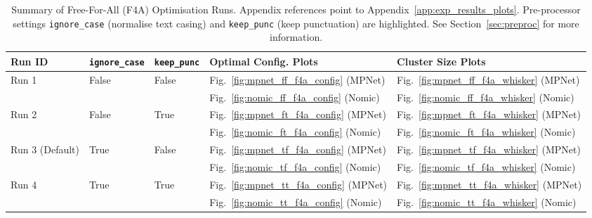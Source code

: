 \documentclass[10pt,oneside]{report}
\begin{document}
\begin{table}[H]
    \centering
    \begin{adjustbox}{max width=\textwidth}
    \begin{tabular}{l l l l l}
        \toprule
        \textbf{Run ID} & \textbf{\texttt{ignore\_case}} & \textbf{\texttt{keep\_punc}} & \textbf{Optimal Config. Plots} & \textbf{Cluster Size Plots} \\
        \midrule
        Run 1           & False   & False & Fig.~\ref{fig:mpnet_ff_f4a_config} (MPNet) & Fig.~\ref{fig:mpnet_ff_f4a_whisker} (MPNet) \\
                        &         &                             & Fig.~\ref{fig:nomic_ff_f4a_config} (Nomic) & Fig.~\ref{fig:nomic_ff_f4a_whisker} (Nomic) \\
        Run 2           & False   & True & Fig.~\ref{fig:mpnet_ft_f4a_config} (MPNet) & Fig.~\ref{fig:mpnet_ft_f4a_whisker} (MPNet) \\
                        &         &                             & Fig.~\ref{fig:nomic_ft_f4a_config} (Nomic) & Fig.~\ref{fig:nomic_ft_f4a_whisker} (Nomic) \\
        Run 3 (Default) & True    & False & Fig.~\ref{fig:mpnet_tf_f4a_config} (MPNet) & Fig.~\ref{fig:mpnet_tf_f4a_whisker} (MPNet) \\
                        &         &                              & Fig.~\ref{fig:nomic_tf_f4a_config} (Nomic) & Fig.~\ref{fig:nomic_tf_f4a_whisker} (Nomic) \\
        Run 4           & True    & True & Fig.~\ref{fig:mpnet_tt_f4a_config} (MPNet) & Fig.~\ref{fig:mpnet_tt_f4a_whisker} (MPNet) \\
                        &         &                                                    & Fig.~\ref{fig:nomic_tt_f4a_config} (Nomic) & Fig.~\ref{fig:nomic_tt_f4a_whisker} (Nomic) \\
        \bottomrule
    \end{tabular}
    \end{adjustbox}
    \caption{Summary of Free-For-All (F4A) Optimisation Runs. Appendix references point to Appendix~\ref{app:exp_results_plots}. Pre-processor settings \texttt{ignore\_case} (normalise text casing) and \texttt{keep\_punc} (keep punctuation) are highlighted. See Section~\ref{sec:preproc} for more information. }
    \label{tab:f4a_summary}
\end{table}
\end{document}
